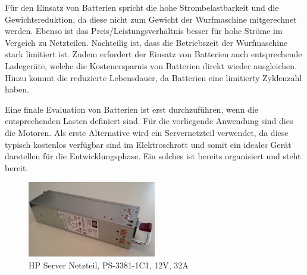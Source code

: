 Für den Einsatz von Batterien spricht die hohe Strombelastbarkeit und die
Gewichtsreduktion, da diese nicht zum Gewicht der Wurfmaschine mitgerechnet
werden. Ebenso ist das Preis/Leistungsverhältnis besser für
hohe Ströme im Vergeich zu Netzteilen. Nachteilig ist, dass die Betriebszeit
der Wurfmaschine stark limitiert ist. Zudem erfordert der Einsatz von
Batterien auch entsprechende Ladegeräte, welche die Kostenersparnis von
Batterien direkt wieder ausgleichen. Hinzu kommt die reduzierte Lebensdauer,
da Batterien eine limitierty Zyklenzahl haben. 

Eine finale Evaluation von Batterien ist erst durchzuführen, wenn die
entsprechenden Lasten definiert sind. Für die vorliegende Anwendung sind
dies die Motoren. Als erste Alternative wird ein Servernetzteil verwendet,
da diese typisch kostenlos verfügbar sind im Elektroschrott und somit ein
ideales Gerät darstellen für die Entwicklungsphase. Ein solches ist bereits
organisiert und steht bereit.

\begin{figure}[h!]
	\centering
	\includegraphics[width=0.5\textwidth]{../../fig/netzteil.jpg}
	\caption{HP Server Netzteil, PS-3381-1C1, 12V, 32A}
	\label{fig:server-power}
\end{figure}
